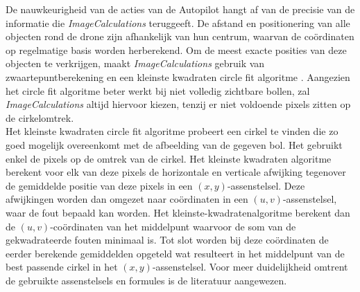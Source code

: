 \noindent
De nauwkeurigheid van de acties van de Autopilot hangt af van de precisie van de informatie die \textit{ImageCalculations} teruggeeft. De afstand en positionering van alle objecten rond de drone zijn afhankelijk van hun centrum, waarvan de co\"ordinaten op regelmatige basis worden herberekend. Om de meest exacte posities van deze objecten te verkrijgen, maakt \textit{ImageCalculations} gebruik van zwaartepuntberekening en een kleinste kwadraten circle fit algoritme \cite{website:kleinsteKwadraten}. Aangezien het circle fit algoritme beter werkt bij niet volledig zichtbare bollen, zal \textit{ImageCalculations} altijd hiervoor kiezen, tenzij er niet voldoende pixels zitten op de cirkelomtrek.
\\
Het kleinste kwadraten circle fit algoritme probeert een cirkel te vinden die zo goed mogelijk overeenkomt met de afbeelding van de gegeven bol. Het gebruikt enkel de pixels op de omtrek van de cirkel. Het kleinste kwadraten algoritme berekent voor elk van deze pixels de horizontale en verticale afwijking tegenover de gemiddelde positie van deze pixels in een \((x,y)\)-assenstelsel. Deze afwijkingen worden dan omgezet naar co\"ordinaten in een \((u,v)\)-assenstelsel, waar de fout bepaald kan worden. Het kleinste-kwadratenalgoritme berekent dan de \((u,v)\)-co\"ordinaten van het middelpunt waarvoor de som van de gekwadrateerde fouten minimaal is. Tot slot worden bij deze co\"ordinaten de eerder berekende gemiddelden opgeteld wat resulteert in het middelpunt van de best passende cirkel in het \((x,y)\)-assenstelsel. Voor meer duidelijkheid omtrent de gebruikte assenstelsels en formules is de literatuur \cite{website:kleinsteKwadraten} aangewezen. 
